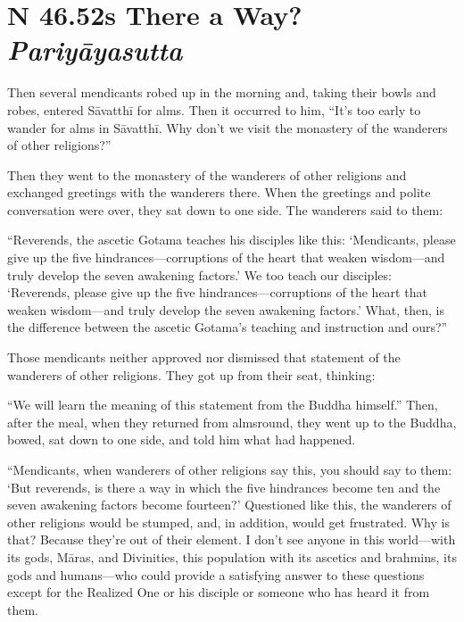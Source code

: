 \documentclass[12pt,openany]{book}%
\newcommand*{\suttatitleacronym}[1]{\smaller[2]{#1}\vspace*{.3em}}
\newcommand*{\suttatitletranslation}[1]{\linebreak{#1}}
\newcommand*{\suttatitleroot}[1]{\linebreak\smaller[2]\itshape{#1}}
\newcommand*{\tocacronym}[1]{\hspace*{-3.3em}{#1}\quad}
\newcommand*{\toctranslation}[1]{#1}
\newcommand*{\tocroot}[1]{(\textit{#1})}
\begin{document}
%
\section*{{\suttatitleacronym SN 46.52}{\suttatitletranslation Is There a Way? }{\suttatitleroot Pariyāyasutta}}
\addcontentsline{toc}{section}{\tocacronym{SN 46.52} \toctranslation{Is There a Way? } \tocroot{Pariyāyasutta}}

Then several mendicants robed up in the morning and, taking their bowls and robes, entered \textsanskrit{Sāvatthī} for alms. Then it occurred to him, “It’s too early to wander for alms in \textsanskrit{Sāvatthī}. Why don’t we visit the monastery of the wanderers of other religions?” 

Then they went to the monastery of the wanderers of other religions and exchanged greetings with the wanderers there. When the greetings and polite conversation were over, they sat down to one side. The wanderers said to them: 

“Reverends, the ascetic Gotama teaches his disciples like this: ‘Mendicants, please give up the five hindrances—corruptions of the heart that weaken wisdom—and truly develop the seven awakening factors.’ We too teach our disciples: ‘Reverends, please give up the five hindrances—corruptions of the heart that weaken wisdom—and truly develop the seven awakening factors.’ What, then, is the difference between the ascetic Gotama’s teaching and instruction and ours?” 

Those mendicants neither approved nor dismissed that statement of the wanderers of other religions. They got up from their seat, thinking: 

“We will learn the meaning of this statement from the Buddha himself.” Then, after the meal, when they returned from almsround, they went up to the Buddha, bowed, sat down to one side, and told him what had happened. 

“Mendicants, when wanderers of other religions say this, you should say to them: ‘But reverends, is there a way in which the five hindrances become ten and the seven awakening factors become fourteen?’ Questioned like this, the wanderers of other religions would be stumped, and, in addition, would get frustrated. Why is that? Because they’re out of their element. I don’t see anyone in this world—with its gods, \textsanskrit{Māras}, and Divinities, this population with its ascetics and brahmins, its gods and humans—who could provide a satisfying answer to these questions except for the Realized One or his disciple or someone who has heard it from them. 
\end{document}
